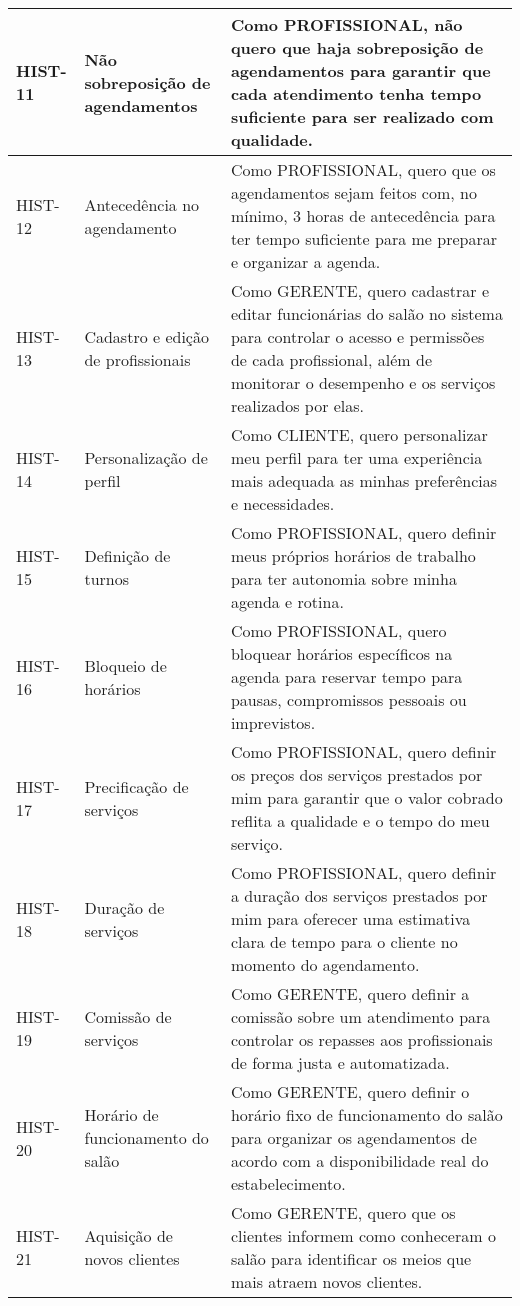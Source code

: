 \begin{longtable}{|p{2cm}|p{4cm}|p{9cm}|}
	HIST-11 & Não sobreposição de agendamentos & Como PROFISSIONAL, não quero que haja sobreposição de agendamentos para garantir que cada atendimento tenha tempo suficiente para ser realizado com qualidade. \\ \hline
	HIST-12 & Antecedência no agendamento & Como PROFISSIONAL, quero que os agendamentos sejam feitos com, no mínimo, 3 horas de antecedência para ter tempo suficiente para me preparar e organizar a agenda. \\ \hline
	HIST-13 & Cadastro e edição de profissionais & Como GERENTE, quero cadastrar e editar funcionárias do salão no sistema para controlar o acesso e permissões de cada profissional, além de monitorar o desempenho e os serviços realizados por elas. \\ \hline
	HIST-14 & Personalização de perfil & Como CLIENTE, quero personalizar meu perfil para ter uma experiência mais adequada as minhas preferências e necessidades. \\ \hline
	HIST-15 & Definição de turnos & Como PROFISSIONAL, quero definir meus próprios horários de trabalho para ter autonomia sobre minha agenda e rotina. \\ \hline
	HIST-16 & Bloqueio de horários & Como PROFISSIONAL, quero bloquear horários específicos na agenda para reservar tempo para pausas, compromissos pessoais ou imprevistos. \\ \hline
	HIST-17 & Precificação de serviços & Como PROFISSIONAL, quero definir os preços dos serviços prestados por mim para garantir que o valor cobrado reflita a qualidade e o tempo do meu serviço. \\ \hline
	HIST-18 & Duração de serviços & Como PROFISSIONAL, quero definir a duração dos serviços prestados por mim para oferecer uma estimativa clara de tempo para o cliente no momento do agendamento. \\ \hline
	HIST-19 & Comissão de serviços & Como GERENTE, quero definir a comissão sobre um atendimento para controlar os repasses aos profissionais de forma justa e automatizada. \\ \hline
	HIST-20 & Horário de funcionamento do salão & Como GERENTE, quero definir o horário fixo de funcionamento do salão para organizar os agendamentos de acordo com a disponibilidade real do estabelecimento. \\ \hline
	HIST-21 & Aquisição de novos clientes & Como GERENTE, quero que os clientes informem como conheceram o salão para identificar os meios que mais atraem novos clientes. \\ \hline

\end{longtable}
